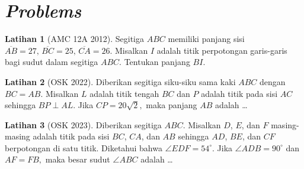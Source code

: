 ﻿\documentclass[aspectratio=169]{beamer}
\theoremstyle{definition}
\newtheorem{latihan}{Latihan}
\begin{document}




\section*{\textit{Problems}}
\begin{frame}{\insertsection}
  \begin{latihan}[AMC 12A 2012]
    Segitiga $ABC$ memiliki panjang sisi $\overline{AB}=27,\,\overline{BC}=25,\, \overline{CA}=26$. Misalkan $I$ adalah titik perpotongan garis-garis bagi sudut dalam segitiga $ABC$. Tentukan panjang $BI$.
  \end{latihan}
  \begin{latihan}[OSK 2022]
    Diberikan segitiga siku-siku sama kaki $ABC$ dengan
    $
      BC = AB.
    $
    Misalkan $L$ adalah titik tengah $BC$ dan $P$ adalah titik
    pada sisi $AC$ sehingga
    $
      BP \perp AL.
    $
    Jika
    $
      CP = 20\sqrt{2},
    $
    maka panjang
    $
      AB
    $
    adalah \ldots
  \end{latihan}
  \begin{latihan}[OSK 2023]
    Diberikan segitiga $ABC$. Misalkan $D$, $E$, dan $F$
    masing-masing adalah titik pada sisi $BC$, $CA$, dan $AB$
    sehingga $AD$, $BE$, dan $CF$ berpotongan di satu titik.
    Diketahui bahwa
    $
      \angle EDF = 54^\circ.
    $
    Jika
    $
      \angle ADB = 90^\circ
    $
    dan
    $
      AF = FB,
    $
    maka besar sudut
    $
      \angle ABC
    $
    adalah \ldots
  \end{latihan}
\end{frame}
\end{document}
